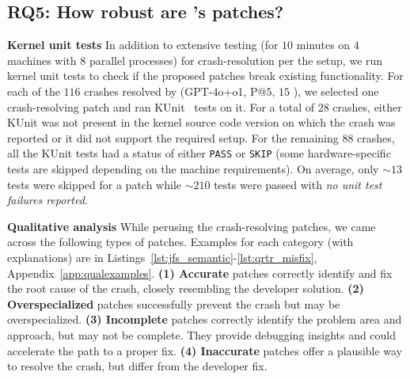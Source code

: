 \subsection{RQ5: How robust are \cresearcher{}'s patches?}
\label{sec:rq5}


\noindent\textbf{Kernel unit tests}
In addition to extensive testing (for $10$ minutes on $4$ machines with $8$ parallel processes) for crash-resolution per the \kbenchsyz{} setup, we run kernel unit tests to check if the proposed patches break existing functionality.
For each of the $116$ crashes resolved by \cresearcher{} (GPT-4o+o1, P@$5$, $15$ \maxcalls{}), we selected one crash-resolving patch and ran KUnit~\citep{kunit} tests on it.
For a total of $28$ crashes, either KUnit was not present in the kernel source code version on which the crash was reported or it did not support the required setup.
For the remaining $88$ crashes, all the KUnit tests had a status of either \texttt{PASS} or \texttt{SKIP} (some hardware-specific tests are skipped depending on the machine requirements). On average, only $\sim 13$ tests were skipped for a patch while $\sim 210$ tests were passed with \emph{no unit test failures reported}.

\noindent\textbf{Qualitative analysis}
While perusing the crash-resolving patches, we came across the following types of patches. Examples for each category (with explanations) are in Listings~\ref{lst:jfs_semantic}-\ref{lst:qrtr_misfix}, Appendix~\ref{app:qualexamples}.
\textbf{(1) Accurate} patches correctly identify and fix the root cause of the crash, closely resembling the developer solution.
\textbf{(2) Overspecialized} patches successfully prevent the crash but may be overspecialized.
\textbf{(3) Incomplete} patches correctly identify the problem area and approach, but may not be complete. 
They provide debugging insights and could accelerate the path to a proper fix.
\textbf{(4) Inaccurate} patches offer a plausible way to resolve the crash, but differ from the developer fix.
